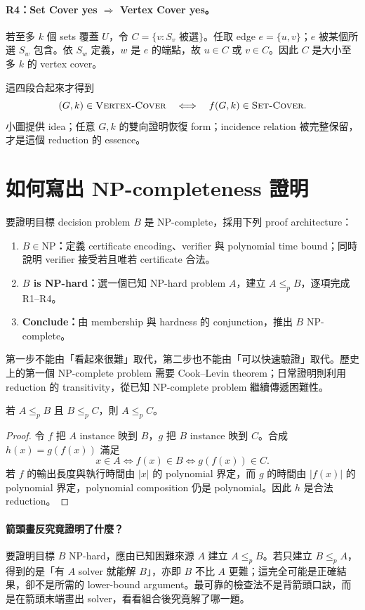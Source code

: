 \documentclass[11pt,a4paper,oneside,openany]{book}
\begin{document}
\paragraph{R4：Set Cover yes $\Rightarrow$ Vertex Cover yes。}
若至多 $k$ 個 sets 覆蓋 $U$，令 $C=\{v:S_v\text{ 被選}\}$。任取 edge $e=\{u,v\}$；$e$ 被某個所選 $S_w$ 包含。依 $S_w$ 定義，$w$ 是 $e$ 的端點，故 $u\in C$ 或 $v\in C$。因此 $C$ 是大小至多 $k$ 的 vertex cover。

這四段合起來才得到
\[
 (G,k)\in\textsc{Vertex-Cover}
 \quad\Longleftrightarrow\quad
 f(G,k)\in\textsc{Set-Cover}.
\]
小圖提供 idea；任意 $G,k$ 的雙向證明恢復 form；incidence relation 被完整保留，才是這個 reduction 的 essence。

\section{如何寫出 NP-completeness 證明}
要證明目標 decision problem $B$ 是 NP-complete，採用下列 proof architecture：
\begin{enumerate}
\item \textbf{$B\in\mathrm{NP}$：}定義 certificate encoding、verifier 與 polynomial time bound；同時說明 verifier 接受若且唯若 certificate 合法。
\item \textbf{$B$ is NP-hard：}選一個已知 NP-hard problem $A$，建立 $A\le_p B$，逐項完成 R1--R4。
\item \textbf{Conclude：}由 membership 與 hardness 的 conjunction，推出 $B$ NP-complete。
\end{enumerate}
第一步不能由「看起來很難」取代，第二步也不能由「可以快速驗證」取代。歷史上的第一個 NP-complete problem 需要 Cook--Levin theorem；日常證明則利用 reduction 的 transitivity，從已知 NP-complete problem 繼續傳遞困難性。

\begin{theorem}
若 $A\le_p B$ 且 $B\le_p C$，則 $A\le_p C$。
\end{theorem}
\begin{proof}
令 $f$ 把 $A$ instance 映到 $B$，$g$ 把 $B$ instance 映到 $C$。合成 $h(x)=g(f(x))$ 滿足
\[
 x\in A\iff f(x)\in B\iff g(f(x))\in C.
\]
若 $f$ 的輸出長度與執行時間由 $|x|$ 的 polynomial 界定，而 $g$ 的時間由 $|f(x)|$ 的 polynomial 界定，polynomial composition 仍是 polynomial。因此 $h$ 是合法 reduction。
\end{proof}

\paragraph{箭頭畫反究竟證明了什麼？}
要證明目標 $B$ NP-hard，應由已知困難來源 $A$ 建立 $A\le_p B$。若只建立 $B\le_p A$，得到的是「有 $A$ solver 就能解 $B$」，亦即 $B$ 不比 $A$ 更難；這完全可能是正確結果，卻不是所需的 lower-bound argument。最可靠的檢查法不是背箭頭口訣，而是在箭頭末端畫出 solver，看看組合後究竟解了哪一題。
\end{document}
